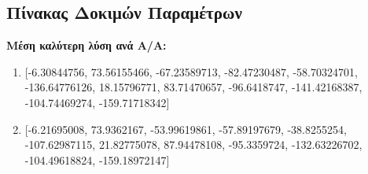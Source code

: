 \documentclass[12pt,a4paper]{article}
\begin{document}
\subsection{Πίνακας Δοκιμών Παραμέτρων}
\begin{table}[H]
    \centering
    \caption{Πίνακας Δοκιμών Παραμέτρων} 
\end{table}

\textbf{Μέση καλύτερη λύση ανά Α/Α:}
\begin{enumerate}
    \item {[-6.30844756, 73.56155466, -67.23589713, -82.47230487, -58.70324701, -136.64776126, 18.15796771, 83.71470657, -96.6418747, -141.42168387, -104.74469274, -159.71718342]}
    \item {[-6.21695008, 73.9362167, -53.99619861, -57.89197679, -38.8255254, -107.62987115, 21.82775078, 87.94478108, -95.3359724, -132.63226702, -104.49618824, -159.18972147]}
\end{enumerate}
\end{document}
